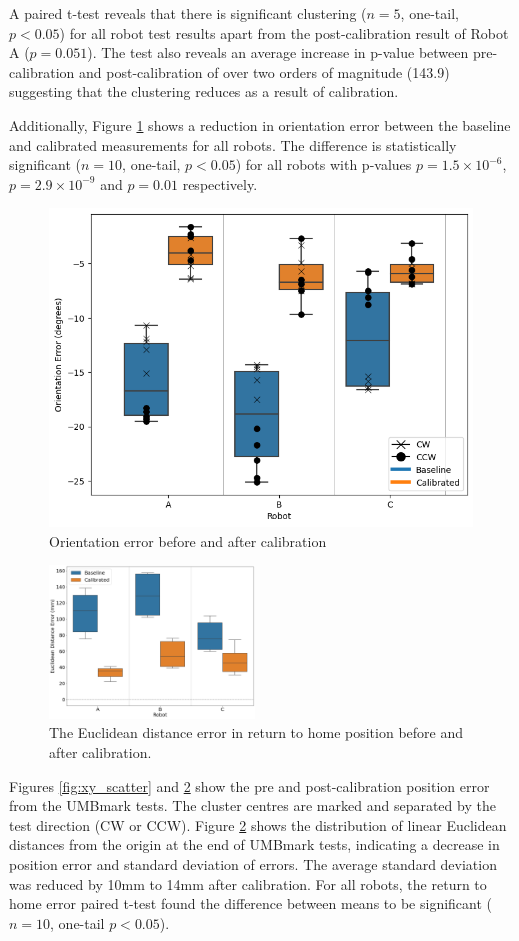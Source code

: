 \documentclass[conference]{IEEEtran}
\begin{document}
A paired t-test reveals that there is significant clustering ($n = 5$, one-tail, $p < 0.05$) for all robot test results apart from the post-calibration result of Robot A ($p=0.051$). The test also reveals an average increase in p-value between pre-calibration and post-calibration of over two orders of magnitude (143.9) suggesting that the clustering reduces as a result of calibration. 

Additionally, Figure \ref{fig:orientation} shows a reduction in orientation error between the baseline and calibrated measurements for all robots. The difference is statistically significant ($n = 10$, one-tail, $p < 0.05$) for all robots with p-values $p=1.5\times10^{-6}$, $p=2.9\times10^{-9}$ and $p=0.01$ respectively. 

\begin{figure}[h!]
    \centering
    \includegraphics[width=.49\textwidth]{img/orientation_error.png}
    \caption{Orientation error before and after calibration}
    \label{fig:orientation}
\end{figure}

\begin{figure}[h!]
    \centering
    \includegraphics[width = 0.485\textwidth]{img/xy_error_boxplot.png}
    \caption{The Euclidean distance error in return to home position before and after calibration.}
    \label{fig:xy_box}
\end{figure}

Figures \ref{fig:xy_scatter} and \ref{fig:xy_box} show the pre and post-calibration position error from the UMBmark tests. 
The cluster centres are marked and separated by the test direction (CW or CCW).
Figure \ref{fig:xy_box} shows the distribution of linear Euclidean distances from the origin at the end of UMBmark tests, indicating a decrease in position error and standard deviation of errors. 
The average standard deviation was reduced by 10mm to 14mm after calibration.
For all robots, the return to home error paired t-test found the difference between means to be significant ($n = 10$, one-tail $p < 0.05$). 
\end{document}
